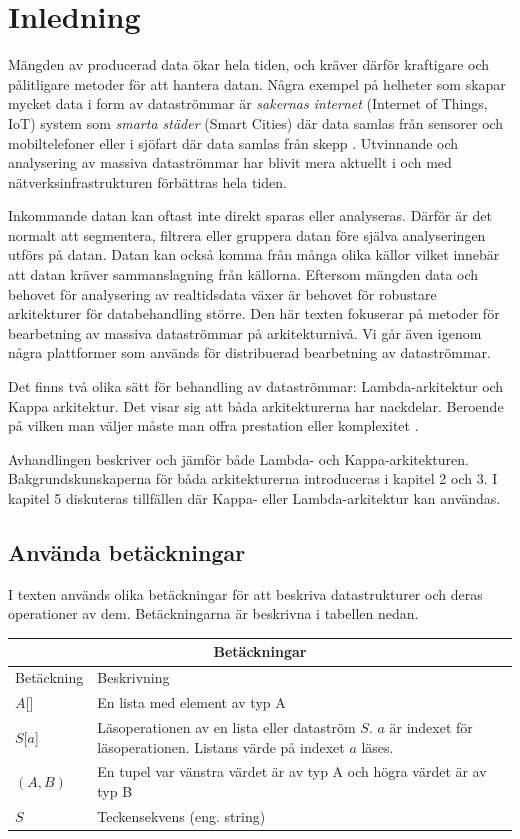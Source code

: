 \chapter{Inledning}

Mängden av producerad data ökar hela tiden, och kräver därför kraftigare och pålitligare
metoder för att hantera datan. Några exempel på helheter som skapar mycket data i form av
dataströmmar är \textit{sakernas internet} (Internet of Things, IoT) system som \textit{smarta städer}
(Smart Cities) där data samlas från sensorer och mobiltelefoner \citep{vakali2014smart}
eller i sjöfart där data samlas från skepp \citep{xu2019internet}. Utvinnande och analysering
av massiva dataströmmar har blivit mera aktuellt i och med nätverksinfrastrukturen förbättras hela tiden.

Inkommande datan  kan oftast inte direkt sparas eller analyseras. Därför är det normalt att
segmentera, filtrera eller gruppera datan före själva analyseringen utförs på datan.
Datan kan också komma från många olika källor \citep{beringer2006online} vilket innebär att datan kräver sammanslagning från källorna. Eftersom mängden data och behovet för analysering av realtidsdata växer
är behovet för robustare arkitekturer för databehandling större. Den här texten fokuserar på metoder för
bearbetning av massiva dataströmmar på arkitekturnivå. Vi går även 
igenom några plattformer som används för distribuerad bearbetning av dataströmmar.

Det finns två olika sätt för behandling av dataströmmar: Lambda-arkitektur 
och Kappa arkitektur. Det visar sig att
båda arkitekturerna har nackdelar. Beroende på vilken man väljer måste man
offra prestation eller komplexitet \citep{mci/Feick2018}.

Avhandlingen beskriver och jämför både Lambda- och Kappa-arkitekturen. Bakgrundskunskaperna
för båda arkitekturerna introduceras i kapitel 2 och 3. I kapitel 5 diskuteras tillfällen där Kappa- 
eller Lambda-arkitektur kan användas.

\section{Använda betäckningar}

I texten används olika betäckningar för att beskriva datastrukturer och deras operationer av dem. Betäckningarna är beskrivna i tabellen nedan.

\begin{tabular}{ |p{3cm}||p{8cm}|  }
 \hline
 \multicolumn{2}{|c|}{Betäckningar} \\
 \hline
 Betäckning & Beskrivning\\
 \hline
  $A$[]   &  En lista med element av typ A \\
 $S$[$a$]   &  Läsoperationen av en lista eller dataström $S$. $a$ är indexet för läsoperationen. Listans värde på indexet $a$ läses. \\
 $(A, B)$   &  En tupel var vänstra värdet är av typ A och högra värdet är av typ B\\
 $S$ & Teckensekvens (eng. string)\\
 \hline
\end{tabular}



